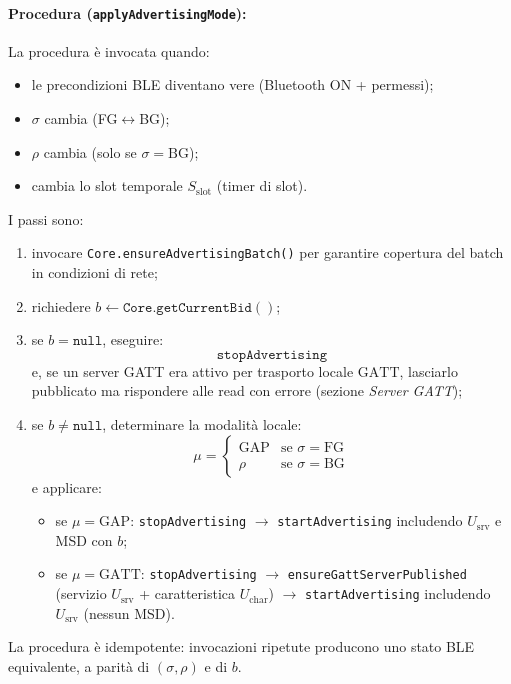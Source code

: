 \documentclass[a4paper,11pt,table,dvipsnames]{article}
\begin{document}
\paragraph{Procedura (\texttt{applyAdvertisingMode}):}
La procedura è invocata quando:
\begin{itemize}[nosep]
    \item le precondizioni BLE diventano vere (Bluetooth ON + permessi);
    \item \(\sigma\) cambia (FG\(\leftrightarrow\)BG);
    \item \(\rho\) cambia (solo se \(\sigma=\mathrm{BG}\));
    \item cambia lo slot temporale \(S_{\text{slot}}\) (timer di slot).
\end{itemize}
I passi sono:
\begin{enumerate}
    \item invocare \texttt{Core.ensureAdvertisingBatch()} per garantire copertura del batch in condizioni di rete;
    \item richiedere \(b \leftarrow \texttt{Core.getCurrentBid}()\);
    \item se \(b=\texttt{null}\), eseguire:
          \[
              \texttt{stopAdvertising}
          \]
          e, se un server GATT era attivo per trasporto locale \(\text{GATT}\), lasciarlo pubblicato ma rispondere alle read con errore (sezione \emph{Server GATT});
    \item se \(b\neq \texttt{null}\), determinare la modalità locale:
          \[
              \mu =
              \begin{cases}
                  \mathrm{GAP} & \text{se }\sigma=\mathrm{FG} \\
                  \rho         & \text{se }\sigma=\mathrm{BG}
              \end{cases}
          \]
          e applicare:
          \begin{itemize}[nosep]
              \item se \(\mu=\mathrm{GAP}\): \texttt{stopAdvertising} \(\rightarrow\) \texttt{startAdvertising} includendo \(U_{\text{srv}}\) e MSD con \(b\);
              \item se \(\mu=\mathrm{GATT}\): \texttt{stopAdvertising} \(\rightarrow\) \texttt{ensureGattServerPublished} (servizio \(U_{\text{srv}}\) + caratteristica \(U_{\text{char}}\)) \(\rightarrow\) \texttt{startAdvertising} includendo \(U_{\text{srv}}\) (nessun MSD).
          \end{itemize}
\end{enumerate}
La procedura è idempotente: invocazioni ripetute producono uno stato BLE equivalente, a parità di \((\sigma,\rho)\) e di \(b\).
\end{document}
